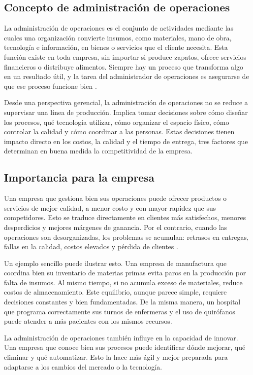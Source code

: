\subsection{Concepto de administración de operaciones}
La administración de operaciones es el conjunto de actividades mediante las cuales una organización convierte insumos, como materiales, mano de obra, tecnología e información, en bienes o servicios que el cliente necesita. Esta función existe en toda empresa, sin importar si produce zapatos, ofrece servicios financieros o distribuye alimentos. Siempre hay un proceso que transforma algo en un resultado útil, y la tarea del administrador de operaciones es asegurarse de que ese proceso funcione bien \parencite{chase2014}.

Desde una perspectiva gerencial, la administración de operaciones no se reduce a supervisar una línea de producción. Implica tomar decisiones sobre cómo diseñar los procesos, qué tecnología utilizar, cómo organizar el espacio físico, cómo controlar la calidad y cómo coordinar a las personas. Estas decisiones tienen impacto directo en los costos, la calidad y el tiempo de entrega, tres factores que determinan en buena medida la competitividad de la empresa.

\subsection{Importancia para la empresa}
Una empresa que gestiona bien sus operaciones puede ofrecer productos o servicios de mejor calidad, a menor costo y con mayor rapidez que sus competidores. Esto se traduce directamente en clientes más satisfechos, menores desperdicios y mejores márgenes de ganancia. Por el contrario, cuando las operaciones son desorganizadas, los problemas se acumulan: retrasos en entregas, fallas en la calidad, costos elevados y pérdida de clientes \parencite{heizer2014}.

Un ejemplo sencillo puede ilustrar esto. Una empresa de manufactura que coordina bien su inventario de materias primas evita paros en la producción por falta de insumos. Al mismo tiempo, si no acumula exceso de materiales, reduce costos de almacenamiento. Este equilibrio, aunque parece simple, requiere decisiones constantes y bien fundamentadas. De la misma manera, un hospital que programa correctamente sus turnos de enfermeras y el uso de quirófanos puede atender a más pacientes con los mismos recursos.

La administración de operaciones también influye en la capacidad de innovar. Una empresa que conoce bien sus procesos puede identificar dónde mejorar, qué eliminar y qué automatizar. Esto la hace más ágil y mejor preparada para adaptarse a los cambios del mercado o la tecnología.

